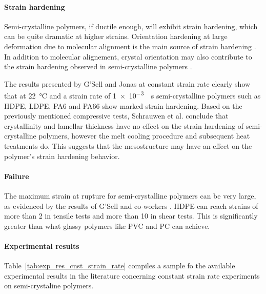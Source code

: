 \paragraph{Strain hardening}
Semi-crystalline polymers, if ductile enough, will exhibit strain hardening, which can be quite dramatic at higher strains.
Orientation hardening at large deformation due to molecular alignment is the main source of strain hardening \citep{ahziModelingDeformationBehavior2003}.
In addition to molecular alignement, crystal orientation may also contribute to the strain hardening observed in semi-crystalline polymers \citep{abdul-hameedTwophaseHyperelasticviscoplasticConstitutive2014}.

The results presented by G'Sell and Jonas \citep{gsellYieldTransientEffects1981} at constant strain rate clearly show that at \SI{22}{\celsius} and a strain rate of \SI{1e-3}{\per\second} semi-crystalline polymers such as HDPE, LDPE, PA6 and PA66 show marked strain hardening.
Based on the previously mentioned compressive tests, Schrauwen et al. \citep{schrauwenIntrinsicDeformationBehavior2004} conclude that crystallinity and lamellar thickness have no effect on the strain hardening of semi-crystalline polymers, however the melt cooling procedure and subsequent heat treatments do.
This suggests that the mesostructure may have an effect on the polymer's strain hardening behavior.

\paragraph{Failure}
The maximum strain at rupture for semi-crystalline polymers can be very large, as evidenced by the results of G'Sell and co-workers \citep{gsellYieldTransientEffects1981, gsellApplicationPlaneSimple1983}.
HDPE can reach strains of more than 2 in tensile tests and more than 10 in shear tests.
This is significantly greater than what glassy polymers like PVC and PC can achieve.

\paragraph{Experimental results}

Table~\ref{tab:exp_res_cnst_strain_rate} compiles a sample fo the available experimental results in the literature concerning constant strain rate experiments on semi-crystaline polymers.

